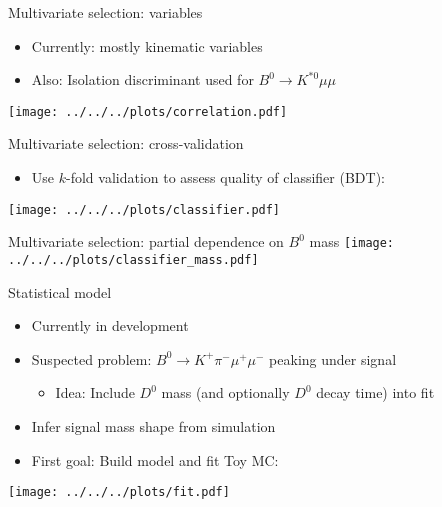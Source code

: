 \documentclass[compress,aspectratio=43]{beamer}
\begin{document}
\begin{frame}{Multivariate selection: variables}
  \begin{itemize}
    \item Currently: mostly kinematic variables
    \item Also: Isolation discriminant used for $B^0\to K^{*0}\mu\mu$
  \end{itemize}
  \centering
  \texttt{[image: ../../../plots/correlation.pdf]}
\end{frame}

\begin{frame}{Multivariate selection: cross-validation}
  \begin{itemize}
    \item Use $k$-fold validation to assess quality of classifier (BDT):
  \end{itemize}
  \centering
  \texttt{[image: ../../../plots/classifier.pdf]}
\end{frame}

\begin{frame}{Multivariate selection: partial dependence on $B^0$ mass}
  \centering
  \texttt{[image: ../../../plots/classifier\_mass.pdf]}
\end{frame}

\begin{frame}{Statistical model}
  \begin{itemize}
    \item Currently in development
    \item Suspected problem: $B^0\to K^+\pi^-\mu^+\mu^-$ peaking under signal
      \begin{itemize}
        \item Idea: Include $D^0$ mass (and optionally $D^0$ decay time) into fit 
      \end{itemize}
    \item Infer signal mass shape from simulation
    \item First goal: Build model and fit Toy MC:
  \end{itemize}
  \centering
  \texttt{[image: ../../../plots/fit.pdf]}
\end{frame}
\end{document}
